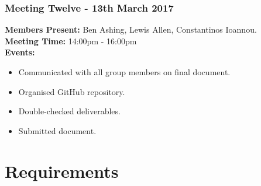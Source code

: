 \documentclass[a4paper]{article}
\begin{document}
\subsubsection*{Meeting Twelve - 13th March 2017}
\textbf{Members Present:} Ben Ashing, Lewis Allen, Constantinos Ioannou. \\
\textbf{Meeting Time:} 14:00pm - 16:00pm \\
\textbf{Events:} 
\begin{itemize}
    \item Communicated with all group members on final document.
    \item Organised GitHub repository.
    \item Double-checked deliverables.
    \item Submitted document.
\end{itemize}

\section{Requirements}
\end{document}
